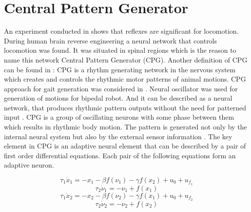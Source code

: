 \documentclass[12pt,a4paper]{report}
\begin{document}
	\section{Central Pattern Generator}

		An experiment conducted in \cite{grillner1975locomotion} shows that reflexes are significant for locomotion. During human brain reverse engineering a neural network that controls locomotion was found. It was situated in spinal regions which is the reason to name this network Central Pattern Generator (CPG).
		Another definition of CPG can be found in \cite{lee2007construction}: CPG is a rhythm generating network in the nervous system which creates and controls the rhythmic motor patterns of animal motions. CPG approach for gait generation was considered in \cite{miyakoshi1998three}. Neural oscillator was used for generation of motions for bipedal robot. And it can be described as a neural network, that produces rhythmic pattern outputs without the need for patterned input \cite{wright2014intelligent}. CPG is a group of oscillating neurons with some phase between them which results in rhythmic body motion. The pattern is generated not only by the internal neural system but also by the external sensor information \cite{miyakoshi1998three}. The key element in CPG is an adaptive neural element that can be described by a pair of first order differential equations. Each pair of the following equations form an adaptive neuron.

		\begin{equation}\label{eq:CPG1}
			\tau_1 \dot{x}_1 = -x_1 - \beta f(\nu_1) -  \gamma f(x_2) + u_0 + u_{f_1}
		\end{equation}
		\begin{equation}\label{eq:CPG2}
			\tau_2 \dot{\nu}_1 = -\nu_1  + f(x_1)
		\end{equation}
		\begin{equation}\label{eq:CPG3}
			\tau_1 \dot{x}_2 = -x_2 - \beta f(\nu_2) -  \gamma f(x_1) + u_0 + u_{f_2}
		\end{equation}
		\begin{equation}\label{eq:CPG4}
			\tau_2 \dot{\nu}_2 = -\nu_2  + f(x_2)
		\end{equation}
\end{document}
